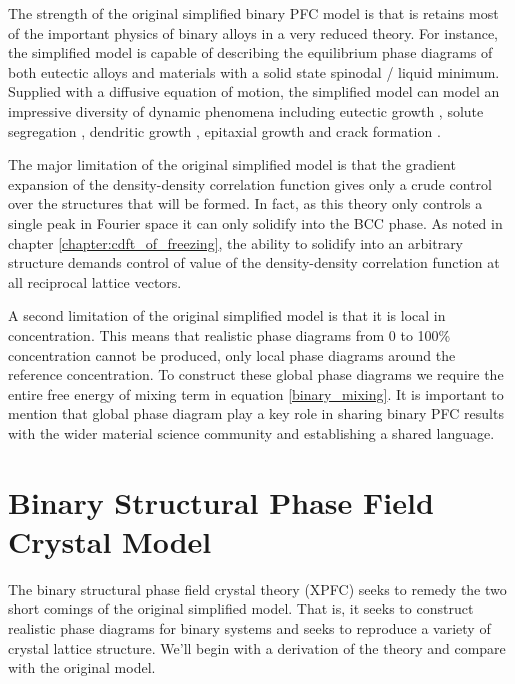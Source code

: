 The strength of the original simplified binary PFC model is that is retains
most of the important physics of binary alloys in a very reduced theory. For
instance, the simplified model is capable of describing the equilibrium phase
diagrams of both eutectic alloys and materials with a solid state spinodal /
liquid minimum.  Supplied with a diffusive equation of motion, the simplified
model can model an impressive diversity of dynamic phenomena including eutectic
growth \cite{ELDER07}, solute segregation \cite{STOLLE14}, dendritic growth
\cite{ELDER07}, epitaxial growth \cite{ELDER10_NANOISLAND, LU16} and crack
formation \cite{HU17}.

The major limitation of the original simplified model is that the gradient
expansion of the density-density correlation function gives only a crude
control over the structures that will be formed. In fact, as this theory only
controls a single peak in Fourier space it can only solidify into the BCC
phase. As noted in chapter \ref{chapter:cdft_of_freezing}, the ability to
solidify into an arbitrary structure demands control of value of the
density-density correlation function at all reciprocal lattice vectors.

A second limitation of the original simplified model is that it is local in
concentration. This means that realistic phase diagrams from 0 to 100\%
concentration cannot be produced, only local phase diagrams around the
reference concentration. To construct these global phase diagrams we require
the entire free energy of mixing term in equation \ref{binary_mixing}. It 
is important to mention that global phase diagram play a key role in 
sharing binary PFC results with the wider material science community and
establishing a shared language. 

\section{Binary Structural Phase Field Crystal Model} %

The binary structural phase field crystal theory (XPFC) seeks to remedy the two
short comings of the original simplified model. That is, it seeks to construct
realistic phase diagrams for binary systems and seeks to reproduce a variety 
of crystal lattice structure. We'll begin with a derivation of the theory and
compare with the original model.


